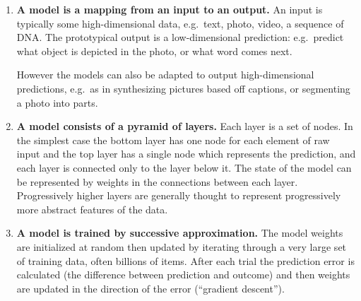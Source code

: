 \documentclass[
  11pt,
  letterpaper,
  DIV=11,
  numbers=noendperiod,
  oneside]{scrartcl}
\begin{document}
\begin{enumerate}
\def\labelenumi{\arabic{enumi}.}
\item
  \textbf{A model is a mapping from an input to an output.} An input is
  typically some high-dimensional data, e.g.~text, photo, video, a
  sequence of DNA. The prototypical output is a low-dimensional
  prediction: e.g.~predict what object is depicted in the photo, or what
  word comes next.

  However the models can also be adapted to output high-dimensional
  predictions, e.g.~as in synthesizing pictures based off captions, or
  segmenting a photo into parts.
\item
  \textbf{A model consists of a pyramid of layers.} Each layer is a set
  of nodes. In the simplest case the bottom layer has one node for each
  element of raw input and the top layer has a single node which
  represents the prediction, and each layer is connected only to the
  layer below it. The state of the model can be represented by weights
  in the connections between each layer. Progressively higher layers are
  generally thought to represent progressively more abstract features of
  the data.
\item
  \textbf{A model is trained by successive approximation.} The model
  weights are initialized at random then updated by iterating through a
  very large set of training data, often billions of items. After each
  trial the prediction error is calculated (the difference between
  prediction and outcome) and then weights are updated in the direction
  of the error (``gradient descent'').
\end{enumerate}
\end{document}
